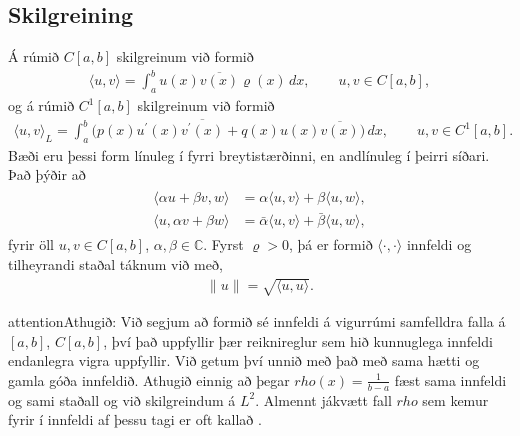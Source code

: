 \documentclass[a4paper,10pt,icelandic]{sphinxmanual}
\begin{document}
\subsection{Skilgreining}
\label{\detokenize{Kafli03:id2}}
Á rúmið \(C[a,b]\) skilgreinum við formið
\begin{equation*}
\begin{split}{{\langle u,v\rangle}} =\int_a^b u(x)\overline{v(x)}{\varrho}(x)\, dx, \qquad
 u,v\in C[a,b],\end{split}
\end{equation*}
og á rúmið \(C^1[a,b]\) skilgreinum við formið
\begin{equation*}
\begin{split}{{\langle u,v\rangle}}_L =\int_a^b \bigg(p(x)u{{^{\prime}}}(x)\overline{v{{^{\prime}}}(x)}
 +q(x)u(x)\overline{v(x)}\bigg) \, dx, \qquad
 u,v\in C^1[a,b].\end{split}
\end{equation*}
Bæði eru þessi form línuleg í fyrri breytistærðinni, en andlínuleg í
þeirri síðari. Það þýðir að
\begin{equation*}
\begin{split}\begin{aligned}
  {{\langle \alpha u+\beta v,w\rangle}} &=
 \alpha{{\langle u,v\rangle}} + \beta{{\langle u,w\rangle}},\\
 {{\langle u,\alpha v+\beta w\rangle}}&=\bar\alpha{{\langle u,v\rangle}} +\bar\beta
 {{\langle u,w\rangle}},\end{aligned}\end{split}
\end{equation*}
fyrir öll \(u,v\in C[a,b]\), \(\alpha,\beta\in {{\mathbb  C}}\). Fyrst \({\varrho}>0\), þá er
formið \({{\langle \cdot,\cdot\rangle}}\) innfeldi
og tilheyrandi staðal táknum við með,
\begin{equation*}
\begin{split}\|u\|= \sqrt{{{\langle u,u\rangle}}}.\end{split}
\end{equation*}
\begin{sphinxadmonition}{attention}{Athugið:}
Við segjum að formið sé innfeldi á vigurrúmi samfelldra falla á \([a,b]\), \(C[a,b]\), því það uppfyllir þær reiknireglur sem hið kunnuglega innfeldi endanlegra vigra uppfyllir. Við getum því unnið með það með sama hætti og gamla góða innfeldið.  Athugið einnig að þegar \(rho(x) = \frac{1}{b-a}\) fæst sama innfeldi og sami staðall og við skilgreindum á \(L^2\). Almennt jákvætt fall \(rho\) sem kemur fyrir í innfeldi af þessu tagi er oft kallað .
\end{sphinxadmonition}
\end{document}
